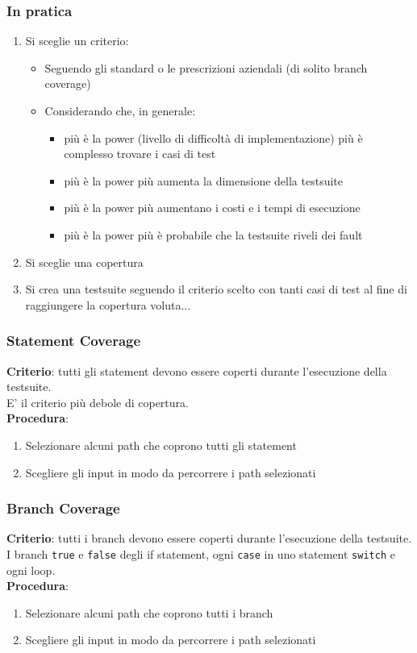 \documentclass[12pt, a4paper]{report}
\begin{document}
\subsubsection{In pratica}
\begin{enumerate}
    \item Si sceglie un criterio: \begin{itemize}
        \item Seguendo gli standard o le prescrizioni aziendali (di solito branch coverage)
        \item Considerando che, in generale: \begin{itemize}
            \item più è la power (livello di difficoltà di implementazione) più è complesso trovare i casi di test
            \item più è la power più aumenta la dimensione della testsuite
            \item più è la power più aumentano i costi e i tempi di esecuzione
            \item più è la power più è probabile che la testsuite riveli dei fault
        \end{itemize}
    \end{itemize}
    \item Si sceglie una copertura
    \item Si crea una testsuite seguendo il criterio scelto con tanti casi di test al fine di raggiungere la copertura voluta...
\end{enumerate}
\subsubsection{Statement Coverage}
\textbf{Criterio}: tutti gli statement devono essere coperti durante l'esecuzione della testsuite.\\
E' il criterio più debole di copertura.\\
\textbf{Procedura}: \begin{enumerate}
    \item Selezionare alcuni path che coprono tutti gli statement
    \item Scegliere gli input in modo da percorrere i path selezionati
\end{enumerate}
\subsubsection{Branch Coverage}
\textbf{Criterio}: tutti i branch devono essere coperti durante l'esecuzione della testsuite.\\
I branch \texttt{true} e \texttt{false} degli if statement, ogni \texttt{case} in uno statement \texttt{switch} e ogni loop.\\
\textbf{Procedura}: \begin{enumerate}
    \item Selezionare alcuni path che coprono tutti i branch
    \item Scegliere gli input in modo da percorrere i path selezionati
\end{enumerate}
\end{document}
